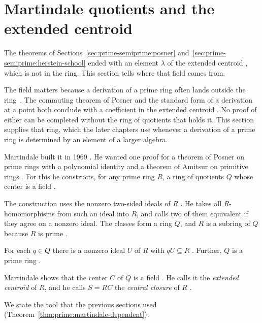 \section{Martindale quotients and the extended centroid}\label{sec:prime-semiprime:quotient-rings}

The theorems of Sections~\ref{sec:prime-semiprime:posner}
and~\ref{sec:prime-semiprime:herstein-school} ended with an element $\lambda$
of the extended centroid \cite[p.~577]{Martindale1969}, which is not in the
ring. This section tells where that field comes from.

The field matters because a derivation of a prime ring often lands outside the
ring~\cite[p.~576]{Martindale1969}. The commuting theorem of Posner and the standard form of a derivation at
a point both conclude with a coefficient in the extended centroid
\cite[p.~576]{Martindale1969}. No proof of either can be completed
without the ring of quotients that holds it.
This section supplies that ring, which the later chapters use whenever a
derivation of a prime ring is determined by an element of a larger algebra.

Martindale built it in 1969 \cite{Martindale1969}. He wanted one proof for a
theorem of Posner on prime rings with a polynomial identity and a theorem of
Amitsur on primitive rings \cite[p.~576]{Martindale1969}. For this he
constructs, for any prime ring $R$, a ring of quotients $Q$ whose center is a
field \cite[p.~576]{Martindale1969}.

The construction uses the nonzero two-sided ideals of $R$
\cite[p.~576]{Martindale1969}. He takes all $R$-homomorphisms from such an
ideal into $R$, and calls two of them equivalent if they agree on a nonzero
ideal. The classes form a ring $Q$, and $R$ is a subring of $Q$ because $R$ is
prime \cite[p.~577]{Martindale1969}.

For each $q\in Q$ there is a nonzero ideal $U$ of $R$ with $qU\subseteq R$
\cite[p.~577]{Martindale1969}. Further, $Q$ is a prime ring
\cite[p.~577]{Martindale1969}.

Martindale shows that the center $C$ of $Q$ is a field
\cite[p.~577]{Martindale1969}. He calls it the \emph{extended centroid} of
$R$, and he calls $S=RC$ the \emph{central closure} of $R$
\cite[p.~577]{Martindale1969}.

We state the tool that the previous sections used
(Theorem~\ref{thm:prime:martindale-dependent}).

